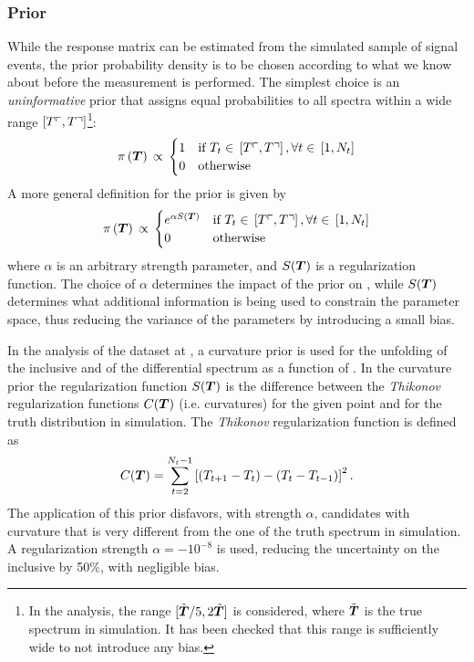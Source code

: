 \subsubsection{Prior}
\label{sec:fbuprior}
While the response matrix can be estimated from the simulated
sample of signal events, the prior probability density \prior{} is to
be chosen according to what we know about \Truth{} before the
measurement is performed.
The simplest choice is an {\it uninformative}
prior that assigns equal probabilities to all \Truth{} spectra within
a wide range $\left[T\ulcorner{}{}, T\urcorner{}{}\right]$\footnote{In the analysis,
the range $[\tilde{\boldsymbol{T}{}}/5, 2\tilde{\boldsymbol{T}}]$ is considered, where
$\tilde{\boldsymbol{T}{}}$ is the true spectrum in simulation. It has been
checked that this range is sufficiently wide to not introduce any bias.}:
\begin{equation}
\pi{}\left(\boldsymbol{T}{}\right){}
\propto{}
\begin{cases}
1 & \text{if }
T_{t}\in{}\left[T\ulcorner{}{}, T\urcorner{}{}\right], \forall{}t\in{}\left[1, N_t\right] \\
0 & \text{otherwise} \\
\end{cases}
\end{equation}
A more general definition for the prior is given by 
\begin{equation}
\pi{}\left(\boldsymbol{T}{}\right){}
\propto{}
\begin{cases}
e^{\alpha{}S(\boldsymbol{T}{})} & \text{if }
T_{t}\in{}\left[T\ulcorner{}{}, T\urcorner{}{}\right], \forall{}t\in{}\left[1, N_t\right] \\
0 & \text{otherwise} \\
\end{cases}
\end{equation}
where $\alpha{}$ is an arbitrary strength parameter, and
$S(\boldsymbol{T}{})$ is a regularization function.
The choice of $\alpha$ determines the impact of the prior on
\conditionalProb{\Truth{}}{\Data{}}, while $S(\boldsymbol{T}{})$ determines
what additional information is being used to constrain the parameter
space, thus reducing the variance of the \Truth{} parameters by
introducing a small bias.

In the analysis of the dataset at \seventev{}, a curvature prior is
used for the unfolding of the inclusive \ac{} and of the
differential \ac{} spectrum as a function of \pttt{}.
In the curvature prior the regularization function $S(\boldsymbol{T}{})$ is
the difference between the \emph{Thikonov} regularization functions
$C(\boldsymbol{T})$ (i.e. curvatures) for the given point \Truth{} and for the
truth distribution in simulation. 
The \emph{Thikonov} regularization function is defined as
\begin{equation}
        C(\boldsymbol{T}{}) =
        \sum_{t=2}^{N_t-1}\left[(T_{t+1}-T_{t})-(T_t-T_{t-1})\right]^2.
\end{equation}
The application of this prior disfavors, with strength $\alpha{}$,
\Truth{} candidates with curvature that is very different from
the one of the truth spectrum in simulation.
A regularization strength $\alpha{}=-10^{-8}$ is used, reducing the
uncertainty on the inclusive \ac{} by 50\%, with negligible bias.


